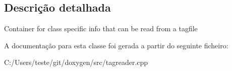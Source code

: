 \subsection{Descrição detalhada}
Container for class specific info that can be read from a tagfile 

A documentação para esta classe foi gerada a partir do seguinte ficheiro\-:\begin{DoxyCompactItemize}
\item 
C\-:/\-Users/teste/git/doxygen/src/tagreader.\-cpp\end{DoxyCompactItemize}
